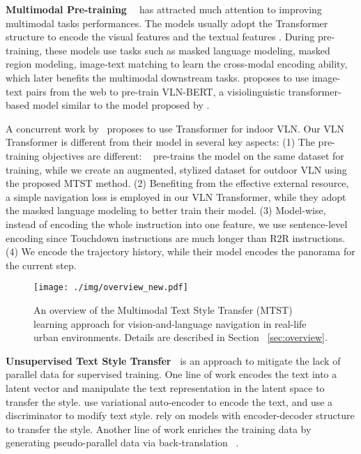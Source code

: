 \documentclass[11pt,a4paper]{article}
\begin{document}
\noindent\textbf{Multimodal Pre-training ~} has attracted much attention to improving multimodal tasks performances. The models usually adopt the Transformer structure to encode the visual features and the textual features \cite{Tan2019LXMERTLC, Lu2019ViLBERTPT,chen2019uniter, Sun2019VideoBERTAJ, Li2019VisualBERTAS, huang2020pixelbert, Luo2020UniViLMAU, Li2020UnicoderVLAU,DBLP:conf/acl/ZhengGK20,DBLP:conf/cvpr/WeiZLZW20,DBLP:conf/acl/TsaiBLKMS19}.
During pre-training, these models use tasks such as masked language modeling, masked region modeling, image-text matching to learn the cross-modal encoding ability, which later benefits the multimodal downstream tasks.
\citet{majumdar2020improving} proposes to use image-text pairs from the web to pre-train VLN-BERT, a visiolinguistic transformer-based model similar to the model proposed by \citet{Lu2019ViLBERTPT}.

A concurrent work by~\citet{DBLP:conf/cvpr/HaoLLCG20} proposes to use Transformer for indoor VLN. Our VLN Transformer is different from their model in several key aspects:
(1) The pre-training objectives are different: ~\citet{DBLP:conf/cvpr/HaoLLCG20} pre-trains the model on the same dataset for training, while we create an augmented, stylized dataset for outdoor VLN using the proposed MTST method.  
(2) Benefiting from the effective external resource, a simple navigation loss is employed in our VLN Transformer, while they adopt the masked language modeling to better train their model. 
(3) Model-wise, instead of encoding the whole instruction into one feature, we use sentence-level encoding since Touchdown instructions are much longer than R2R instructions.
(4) We encode the trajectory history, while their model encodes the panorama for the current step.

\begin{figure*}[t]
\centering
\texttt{[image: ./img/overview\_new.pdf]}
\caption{An overview of the Multimodal Text Style Transfer (MTST) learning approach for vision-and-language navigation in real-life urban environments. Details are described in Section ~\ref{sec:overview}.}
\label{fig:process_overview}
\end{figure*}

\noindent\textbf{Unsupervised Text Style Transfer~} is an approach to mitigate the lack of parallel data for supervised training. One line of work encodes the text into a latent vector and manipulate the text representation in the latent space to transfer the style. \citet{Shen2017StyleTF, Hu2017TowardCG, Yang2018UnsupervisedTS} use variational auto-encoder to encode the text, and use a discriminator to modify text style. \citet{John2018DisentangledRL, Fu2018StyleTI} rely on models with encoder-decoder structure to transfer the style.
Another line of work enriches the training data by generating pseudo-parallel data via back-translation
~\cite{Artetxe2018UnsupervisedNM, Lample2018PhraseBasedN, Lample2018UnsupervisedMT, Zhang2018StyleTA}. 
\end{document}
